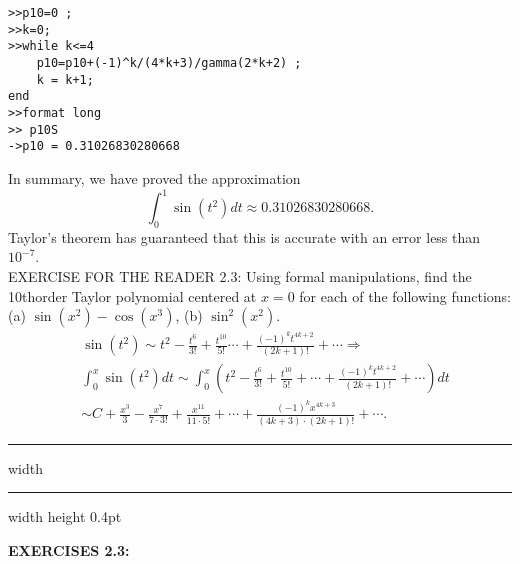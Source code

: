 \documentclass[../main.tex]{subfiles}
\begin{document}
\begin{verbatim}
>>p10=0 ;
>>k=0;
>>while k<=4
	p10=p10+(-1)^k/(4*k+3)/gamma(2*k+2) ;
	k = k+1;
end
>>format long
>> p10S
->p10 = 0.31026830280668
\end{verbatim}

In summary, we have proved the approximation
$$
\int_{0}^{1} \sin \left(t^{2}\right) d t \approx 0.31026830280668 .
$$
Taylor's theorem has guaranteed that this is accurate with an error less than $10^{-7}$.\\

EXERCISE FOR THE READER 2.3: Using formal manipulations, find the 10thorder Taylor polynomial centered at $x=0$ for each of the following functions: (a) $\sin \left(x^{2}\right)-\cos \left(x^{3}\right)$, (b) $\sin ^{2}\left(x^{2}\right)$.
$$
\begin{aligned}
& \sin \left(t^{2}\right) \sim t^{2}-\frac{t^{6}}{3 !}+\frac{t^{10}}{5 !} \cdots+\frac{(-1)^{k} t^{4 k+2}}{(2 k+1) !}+\cdots \Rightarrow \\
& \int_{0}^{x} \sin \left(t^{2}\right) d t \sim \int_{0}^{x}\left(t^{2}-\frac{t^{6}}{3 !}+\frac{t^{10}}{5 !}+\cdots+\frac{(-1)^{k} t^{4 k+2}}{(2 k+1) !}+\cdots\right) d t \\
& \sim C+\frac{x^{3}}{3}-\frac{x^{7}}{7 \cdot 3 !}+\frac{x^{11}}{11 \cdot 5 !}+\cdots+\frac{(-1)^{k} x^{4 k+3}}{(4 k+3) \cdot(2 k+1) !}+\cdots . 
\end{aligned}
$$

\hrule width \hsize \kern 1pt \hrule width \hsize height 0.4pt

\hspace{0.1cm}

\textbf{EXERCISES 2.3: }
\end{document}

